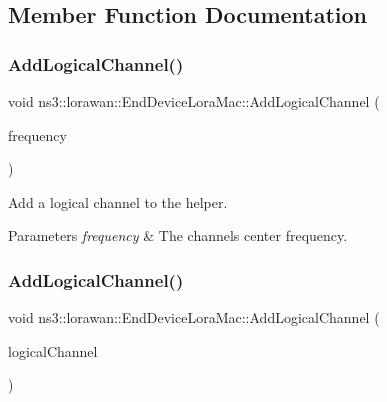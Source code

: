 \subsection{Member Function Documentation}
\mbox{\label{classns3_1_1lorawan_1_1EndDeviceLoraMac_a35d02edc0a4259d5a6a165579a08391b}} 
\subsubsection{\texorpdfstring{Add\+Logical\+Channel()}{AddLogicalChannel()}\hspace{0.1cm}{\footnotesize\ttfamily [1/2]}}
{\footnotesize\ttfamily void ns3\+::lorawan\+::\+End\+Device\+Lora\+Mac\+::\+Add\+Logical\+Channel (\begin{DoxyParamCaption}\item[{double}]{frequency }\end{DoxyParamCaption})}

Add a logical channel to the helper.


\begin{DoxyParams}{Parameters}
{\em frequency} & The channel\textquotesingle{}s center frequency. \\
\hline
\end{DoxyParams}
\mbox{\label{classns3_1_1lorawan_1_1EndDeviceLoraMac_a024d4b672a6b0fd3e8e6d3087dac7d6a}} 
\subsubsection{\texorpdfstring{Add\+Logical\+Channel()}{AddLogicalChannel()}\hspace{0.1cm}{\footnotesize\ttfamily [2/2]}}
{\footnotesize\ttfamily void ns3\+::lorawan\+::\+End\+Device\+Lora\+Mac\+::\+Add\+Logical\+Channel (\begin{DoxyParamCaption}\item[{Ptr$<$ \hyperlink{classns3_1_1lorawan_1_1LogicalLoraChannel}{Logical\+Lora\+Channel} $>$}]{logical\+Channel }\end{DoxyParamCaption})}

